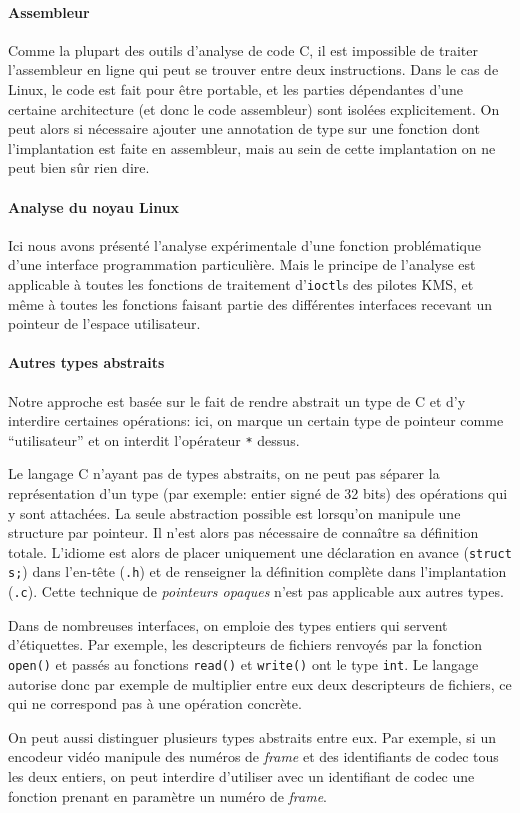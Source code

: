 \paragraph{Assembleur}

Comme la plupart des outils d'analyse de code C, il est impossible de traiter
l'assembleur en ligne qui peut se trouver entre deux instructions. Dans le cas
de Linux, le code est fait pour être portable, et les parties dépendantes d'une
certaine architecture (et donc le code assembleur) sont isolées explicitement.
On peut alors si nécessaire ajouter une annotation de type sur une fonction dont
l'implantation est faite en assembleur, mais au sein de cette implantation on ne
peut bien sûr rien dire.

\paragraph{Analyse du noyau Linux}

Ici nous avons présenté l'analyse expérimentale d'une fonction problématique
d'une interface programmation particulière. Mais le principe de l'analyse est
applicable à toutes les fonctions de traitement d'\texttt{ioctl}s des pilotes
KMS, et même à toutes les fonctions faisant partie des différentes interfaces
recevant un pointeur de l'espace utilisateur.

\paragraph{Autres types abstraits}

Notre approche est basée sur le fait de rendre abstrait un type de C et
d'y interdire certaines opérations: ici, on marque un certain type de pointeur
comme ``utilisateur'' et on interdit l'opérateur \texttt{*} dessus.

Le langage C n'ayant pas de types abstraits, on ne peut pas séparer la
représentation d'un type (par exemple: entier signé de 32 bits) des opérations
qui y sont attachées. La seule abstraction possible est lorsqu'on manipule une
structure par pointeur. Il n'est alors pas nécessaire de connaître sa définition
totale. L'idiome est alors de placer uniquement une déclaration en avance
(\texttt{struct s;}) dans l'en-tête (\texttt{.h}) et de renseigner la définition
complète dans l'implantation (\texttt{.c}). Cette technique de \emph{pointeurs
opaques} n'est pas applicable aux autres types.

Dans de nombreuses interfaces, on emploie des types entiers qui servent
d'étiquettes. Par exemple, les descripteurs de fichiers renvoyés par la fonction
\verb!open()! et passés au fonctions \verb!read()! et \verb!write()! ont
le type \texttt{int}. Le langage autorise donc par exemple de multiplier entre
eux deux descripteurs de fichiers, ce qui ne correspond pas à une opération
concrète.

On peut aussi distinguer plusieurs types abstraits entre eux. Par exemple, si un
encodeur vidéo manipule des numéros de \emph{frame} et des identifiants de codec
tous les deux entiers, on peut interdire d'utiliser avec un identifiant de codec
une fonction prenant en paramètre un numéro de \emph{frame}.

